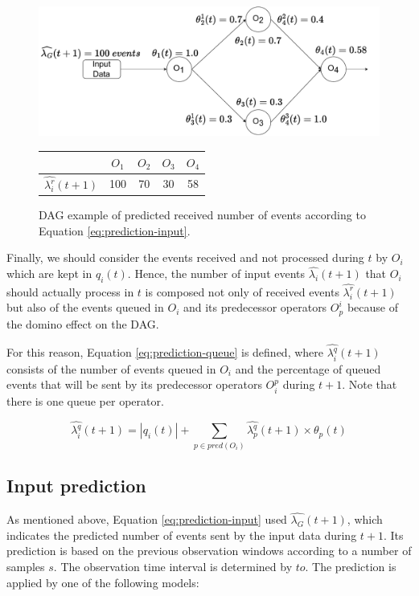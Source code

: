 \begin{figure}[!ht]
    \centering
    \includegraphics[width=1\textwidth]{figures/concepts/PA-SPS-PredictionInput.pdf}

    \vspace*{0.5cm}
    
    \begin{tabular}{c|c|c|c|c}
        & $O_1$ & $O_2$ & $O_3$ & $O_4$\\ \hline
        $\widehat{\lambda^r_i}(t+1)$ & 100 & 70 & 30 & 58
    \end{tabular}
    \caption{DAG example of predicted received number of events according to Equation \ref{eq:prediction-input}.}
    \label{fig:prediction-input}
\end{figure}


Finally, we should consider the events received and not processed during $t$ by $O_i$ which are kept in $q_i(t)$. Hence, the number of input events $\widehat{\lambda_i}(t+1)$ that $O_i$ should actually process in $t$ is composed not only of received events $\widehat{\lambda_i^r}(t+1)$ but also of the events queued in $O_i$ and its predecessor operators $O^i_p$ because of the domino effect on the DAG.

For this reason, Equation \ref{eq:prediction-queue} is defined, where $\widehat{\lambda_i^q}(t+1)$ consists of the number of events queued in $O_i$ and the percentage of queued events that will be sent by its predecessor operators $O^p_i$ during $t+1$. Note that there is one queue per operator.

\begin{equation}
\label{eq:prediction-queue}
  \widehat{\lambda_i^q}(t+1) =  |q_i(t)| + \sum_{p \in pred(O_i)} \widehat{\lambda_p^q}(t+1) \times \theta_p(t)
\end{equation}


\subsection{Input prediction}
\label{psps-input-prediction}
As mentioned above, Equation \ref{eq:prediction-input} used $\widehat{\lambda_G}(t+1)$, which indicates the predicted number of events sent by the input data during $t+1$. Its prediction is based on the previous observation windows according to a number of samples $s$. The observation time interval is determined by $to$. The prediction is applied by one of the following models:

